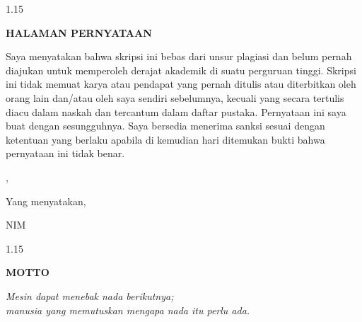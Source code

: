 \newpage
{}
{}
\begin{spacing}{1.15}
\begin{center}
    \textbf{HALAMAN PERNYATAAN}
\end{center}
\vspace{0.5cm}

Saya menyatakan bahwa skripsi ini bebas dari unsur plagiasi dan belum pernah diajukan untuk memperoleh derajat akademik di suatu perguruan tinggi. Skripsi ini tidak memuat karya atau pendapat yang pernah ditulis atau diterbitkan oleh orang lain dan/atau oleh saya sendiri sebelumnya, kecuali yang secara tertulis diacu dalam naskah dan tercantum dalam daftar pustaka. Pernyataan ini saya buat dengan sesungguhnya. Saya bersedia menerima sanksi sesuai dengan ketentuan yang berlaku apabila di kemudian hari ditemukan bukti bahwa pernyataan ini tidak benar.\par

\vspace{1.0cm}
\begin{flushright}
    \begin{minipage}{0.45\textwidth}
        \centering
        \cityname, \makebox[3cm]{\dotfill}\par
        Yang menyatakan,\par
        \vspace{2.0cm}
        \researchername\par
        NIM \researchernim
    \end{minipage}
\end{flushright}
\end{spacing}

\newpage
{}
{}
\begin{spacing}{1.15}
\begin{center}
    \textbf{MOTTO}
\end{center}
\vspace*{\fill}
\begin{center}
\begin{minipage}{0.75\textwidth}
\centering
\itshape
Mesin dapat menebak nada berikutnya;\\
manusia yang memutuskan mengapa nada itu perlu ada.
\end{minipage}
\end{center}
\vspace*{\fill}
\end{spacing}

